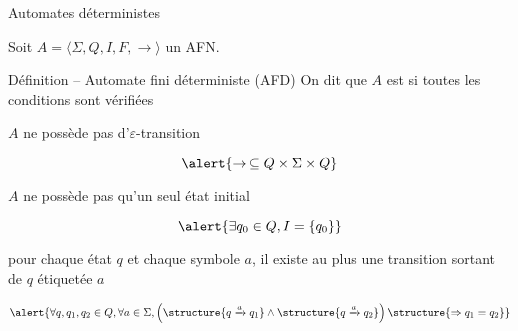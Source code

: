 
\begingroup

\begin{frame}{Automates déterministes}

  Soit $A = \langle \Sigma, Q, I, F, \rightarrow \rangle$ un AFN.
  
  \begin{block}{Définition -- Automate fini déterministe (AFD)}
    On dit que $A$ est  si toutes les conditions sont vérifiées
    \begin{description}
    \item[$\varepsilon$-libre :] $A$ ne possède pas d'$\varepsilon$-transition

      $$\alert{\rightarrow\, \subseteq Q \times \Sigma \times Q}$$

    \item[unitaire :] $A$ ne possède pas qu'un seul état initial

      $$\alert{\exists q_0\in Q, I = \{q_0\}}$$

    \item[fonction partielle :] pour chaque état $q$ et chaque symbole $a$, il existe au plus une transition sortant de $q$ étiquetée $a$

      $$\alert{\forall q, q_1, q_2\in Q,  \forall a\in \Sigma, \left(\structure{q\xrightarrow{a} q_1} \land \structure{q\xrightarrow{a} q_2}\right) \structure{\Rightarrow q_1 = q_2}}$$
    \end{description}
  \end{block}

\end{frame}

\endgroup
